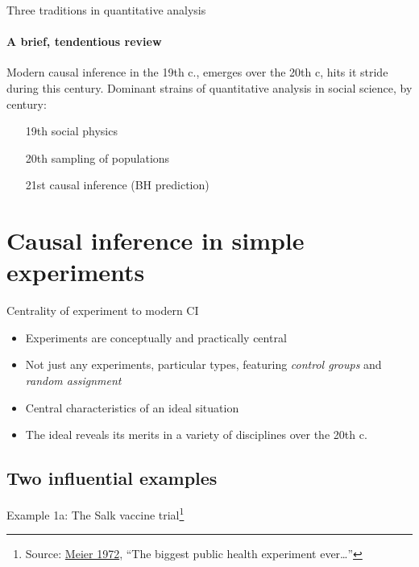 
\begin{frame}{Three traditions in quantitative analysis}
\framesubtitle{A brief, tendentious review}

Modern causal inference in the 19th c., emerges over the 20th c, hits
it stride during this century. Dominant strains of quantitative
analysis in social science, by century:

\begin{itemize}
\item[19th] social physics
\item[20th] sampling of populations
\item[21st] causal inference (BH prediction)
\end{itemize}

  
\end{frame}

\section{Causal inference in simple experiments}

\begin{frame}{Centrality of experiment to modern CI}
  \begin{itemize}
  \item Experiments are conceptually and practically central
  \item Not just any experiments, particular types, featuring
    \textit{control groups} and \textit{random assignment}
  \item Central characteristics of an ideal situation
  \item The ideal reveals its merits in a variety of disciplines over
    the 20th c.  
  \end{itemize}
\end{frame}

\subsection{Two influential examples}
\begin{frame}{Example 1a: The Salk vaccine trial\footnote{Source:
      \href{http://www.cengage.com/resource_uploads/downloads/0534094929_46500.pdf}{Meier 1972}{}, ``The biggest public health experiment ever\ldots''}}



\end{frame}

